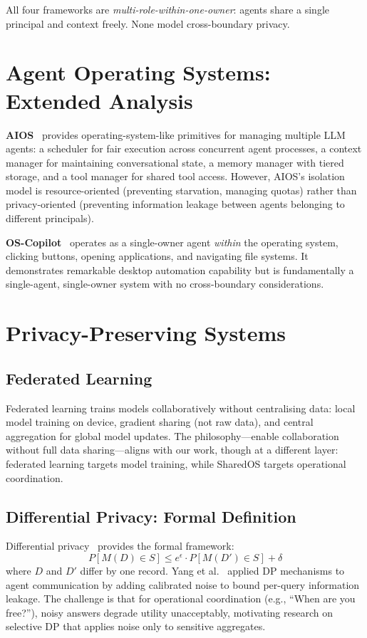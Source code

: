 All four frameworks are \textit{multi-role-within-one-owner}: agents share a single principal and context freely. None model cross-boundary privacy.


\section{Agent Operating Systems: Extended Analysis}

\textbf{AIOS}~\cite{mei2025aios} provides operating-system-like primitives for managing multiple LLM agents: a scheduler for fair execution across concurrent agent processes, a context manager for maintaining conversational state, a memory manager with tiered storage, and a tool manager for shared tool access. However, AIOS's isolation model is resource-oriented (preventing starvation, managing quotas) rather than privacy-oriented (preventing information leakage between agents belonging to different principals).

\textbf{OS-Copilot}~\cite{wu2024oscopilot} operates as a single-owner agent \textit{within} the operating system, clicking buttons, opening applications, and navigating file systems. It demonstrates remarkable desktop automation capability but is fundamentally a single-agent, single-owner system with no cross-boundary considerations.


\section{Privacy-Preserving Systems}

\subsection{Federated Learning}

Federated learning trains models collaboratively without centralising data: local model training on device, gradient sharing (not raw data), and central aggregation for global model updates. The philosophy---enable collaboration without full data sharing---aligns with our work, though at a different layer: federated learning targets model training, while SharedOS targets operational coordination.

\subsection{Differential Privacy: Formal Definition}

Differential privacy~\cite{dwork2006differential} provides the formal framework:
\[
P[M(D) \in S] \leq e^{\epsilon} \cdot P[M(D') \in S] + \delta
\]
where $D$ and $D'$ differ by one record. Yang et al.~\cite{yang2026dpagent} applied DP mechanisms to agent communication by adding calibrated noise to bound per-query information leakage. The challenge is that for operational coordination (e.g., ``When are you free?''), noisy answers degrade utility unacceptably, motivating research on selective DP that applies noise only to sensitive aggregates.


